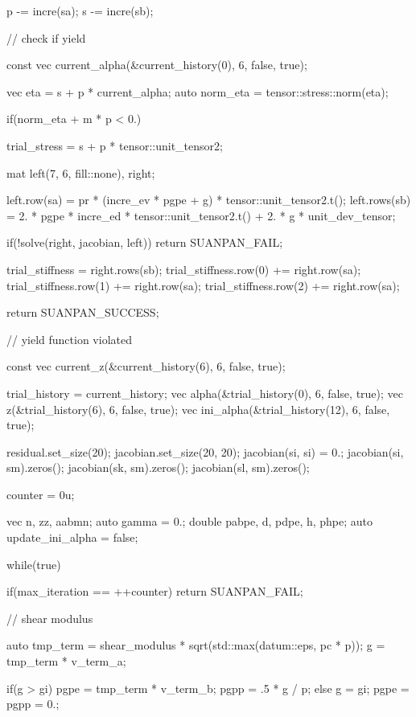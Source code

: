 \begin{cppcode}
{{        p -= incre(sa);
        s -= incre(sb);
    }

    // check if yield

    const vec current_alpha(&current_history(0), 6, false, true);

    vec eta = s + p * current_alpha;
    auto norm_eta = tensor::stress::norm(eta);

    if(norm_eta + m * p < 0.) {
        trial_stress = s + p * tensor::unit_tensor2;

        mat left(7, 6, fill::none), right;

        left.row(sa) = pr * (incre_ev * pgpe + g) * tensor::unit_tensor2.t();
        left.rows(sb) = 2. * pgpe * incre_ed * tensor::unit_tensor2.t() + 2. * g * unit_dev_tensor;

        if(!solve(right, jacobian, left)) return SUANPAN_FAIL;

        trial_stiffness = right.rows(sb);
        trial_stiffness.row(0) += right.row(sa);
        trial_stiffness.row(1) += right.row(sa);
        trial_stiffness.row(2) += right.row(sa);

        return SUANPAN_SUCCESS;
    }

    // yield function violated

    const vec current_z(&current_history(6), 6, false, true);

    trial_history = current_history;
    vec alpha(&trial_history(0), 6, false, true);
    vec z(&trial_history(6), 6, false, true);
    vec ini_alpha(&trial_history(12), 6, false, true);

    residual.set_size(20);
    jacobian.set_size(20, 20);
    jacobian(si, si) = 0.;
    jacobian(si, sm).zeros();
    jacobian(sk, sm).zeros();
    jacobian(sl, sm).zeros();

    counter = 0u;

    vec n, zz, aabmn;
    auto gamma = 0.;
    double pabpe, d, pdpe, h, phpe;
    auto update_ini_alpha = false;

    while(true) {
        if(max_iteration == ++counter) return SUANPAN_FAIL;

        // shear modulus

        auto tmp_term = shear_modulus * sqrt(std::max(datum::eps, pc * p));
        g = tmp_term * v_term_a;

        if(g > gi) {
            pgpe = tmp_term * v_term_b;
            pgpp = .5 * g / p;
        }
        else {
            g = gi;
            pgpe = pgpp = 0.;
        }

}}
\end{cppcode}
